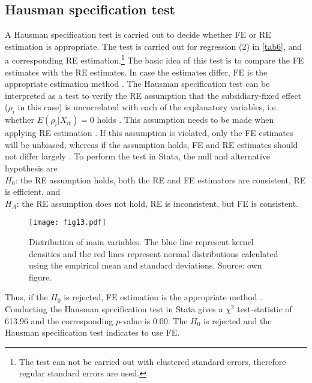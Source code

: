 \documentclass[10pt,twocolumn,oneside,cmyk]{article}
\begin{document}
\subsection{Hausman specification test}\label{app:B2}
A Hausman specification test is carried out to decide whether FE or RE estimation is appropriate. The test is carried out for regression (2) in \cref{tab6}, and a corresponding RE estimation.\footnote{The test can not be carried out with clustered standard errors, therefore regular standard errors are used.} The basic idea of this test is to compare the FE estimates with the RE estimates. In case the estimates differ, FE is the appropriate estimation method \parencite[288]{wooldridge_econometric_2002}. The Hausman specification test can be interpreted as a test to verify the RE assumption that the subsidiary-fixed effect ($\rho_i$ in this case) is uncorrelated with each of the explanatory variables, i.e. whether $E(\rho_i |X_{it})=0$ holds \parencite[1263]{hausman_specification_1978}. This assumption needs to be made when applying RE estimation \parencite[489]{wooldridge_introductory_2009}. If this assumption is violated, only the FE estimates will be unbiased, whereas if the assumption holds, FE and RE estimates should not differ largely \parencite[1263]{hausman_specification_1978}. To perform the test in Stata, the null and alternative hypothesis are\\

\noindent$H_0$: the RE assumption holds, both the RE and FE estimators are consistent, RE is efficient, and\\
$H_A$: the RE assumption does not hold, RE is inconsistent, but FE is consistent.\\

\begin{figure}[!]
 \centering \captionsetup{width=0.95\linewidth}
   \texttt{[image: fig13.pdf]}
 \caption[Distribution of main variables]{Distribution of main variables. The blue line represent kernel densities and the red lines represent normal distributions calculated using the empirical mean and standard deviations. Source: own figure.}\label{fig13}
\end{figure}

Thus, if the $H_0$ is rejected, FE estimation is the appropriate method \parencite[940-943]{statacorp._stata_2015-1}. Conducting the Hausman specification test in Stata gives a $\chi^2$ test-statistic of 613.96 and the corresponding $p$-value is 0.00. The $H_0$ is rejected and the Hausman specification test indicates to use FE.
\newpage
\end{document}
